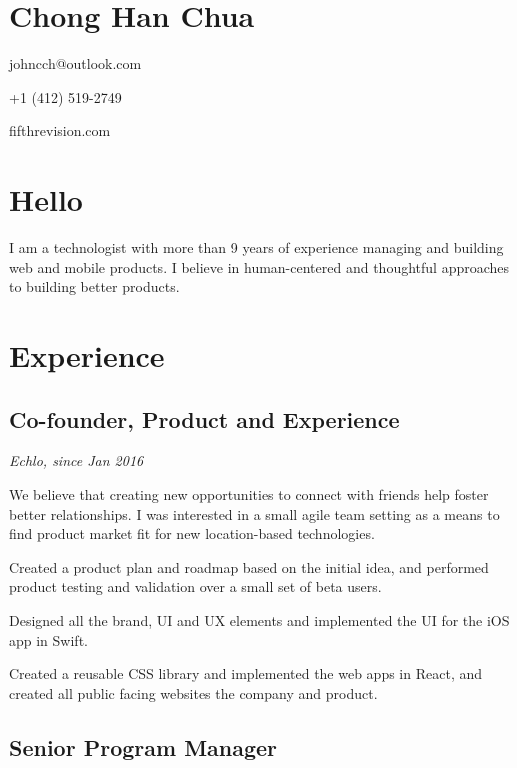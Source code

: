 \section[chong-han-chua]{Chong Han Chua}

\startitemize[packed]
\item
  johncch@outlook.com
\item
  +1 (412) 519-2749
\item
  fifthrevision.com
\stopitemize

\section[hello]{Hello}

I am a technologist with more than 9 years of experience managing and
building web and mobile products. I believe in human-centered and
thoughtful approaches to building better products.

\section[experience]{Experience}

\subsection[co-founder-product-and-experience]{Co-founder, Product and
Experience}

{\em Echlo, since Jan 2016}

We believe that creating new opportunities to connect with friends help
foster better relationships. I was interested in a small agile team
setting as a means to find product market fit for new location-based
technologies.

\startitemize[packed]
\item
  Created a product plan and roadmap based on the initial idea, and
  performed product testing and validation over a small set of beta
  users.
\item
  Designed all the brand, UI and UX elements and implemented the UI for
  the iOS app in Swift.
\item
  Created a reusable CSS library and implemented the web apps in React,
  and created all public facing websites the company and product.
\stopitemize

\subsection[senior-program-manager]{Senior Program Manager}

